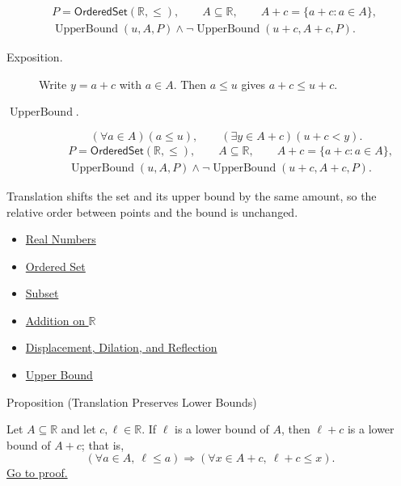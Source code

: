 \begin{remark*}
\[
\begin{aligned}
&P=\mathsf{OrderedSet}(\mathbb{R},\leq),\qquad
A\subseteq\mathbb{R},\qquad A+c=\{a+c:a\in A\},\\
&\operatorname{UpperBound}(u,A,P)\land\neg\operatorname{UpperBound}(u+c,A+c,P).
\end{aligned}
\]
\end{remark*}

\begin{remark*}
\begin{description}
\item[Exposition.]
Write $y=a+c$ with $a\in A$.  Then $a\leq u$ gives $a+c\leq u+c$.


  \item[\(\operatorname{UpperBound}.\)]
  \[
(\forall a\in A)(a\leq u),\qquad
(\exists y\in A+c)(u+c<y).
\]
\[
\begin{aligned}
&P=\mathsf{OrderedSet}(\mathbb{R},\leq),\qquad
A\subseteq\mathbb{R},\qquad A+c=\{a+c:a\in A\},\\
&\operatorname{UpperBound}(u,A,P)\land\neg\operatorname{UpperBound}(u+c,A+c,P).
\end{aligned}
\]
\end{description}
\end{remark*}

\begin{remark*}[Interpretation]
Translation shifts the set and its upper bound by the same amount, so the
relative order between points and the bound is unchanged.
\end{remark*}

\begin{dependencies}
\begin{itemize}
  \item \hyperref[def:reals]{Real Numbers}
  \item \hyperref[def:ordered-set]{Ordered Set}
  \item \hyperref[def:subset]{Subset}
  \item \hyperref[def:addition-on-r]{Addition on $\mathbb{R}$}
  \item \hyperref[def:displacement-dilation-reflection]{Displacement, Dilation, and Reflection}
  \item \hyperref[def:real-upper-bound]{Upper Bound}
\end{itemize}
\end{dependencies}

\begin{propositionbox}{Proposition (Translation Preserves Lower Bounds)}
\begin{proposition}
\label{prop:translation-preserves-lower-bounds}
Let $A\subseteq\mathbb{R}$ and let $c,\ell\in\mathbb{R}$.  If $\ell$ is
a lower bound of $A$, then $\ell+c$ is a lower bound of $A+c$; that is,
\[
\left(\forall a\in A,\ \ell\leq a\right)
\Longrightarrow
\left(\forall x\in A+c,\ \ell+c\leq x\right).
\]
\hyperref[prf:translation-preserves-lower-bounds]{Go to proof.}
\end{proposition}
\end{propositionbox}


